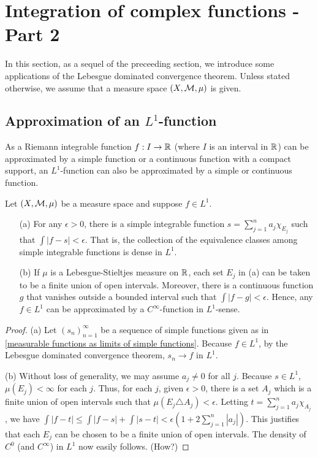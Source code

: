 \section{Integration of complex functions - Part 2}

In this section, as a sequel of the preceeding section, we introduce some applications of the Lebesgue dominated convergence theorem.
Unless stated otherwise, we assume that a measure space $(X, {\mathcal{M}}, \mu)$ is given.

\subsection{Approximation of an $L^1$-function}
As a Riemann integrable function $f: I\rightarrow{\mathbb{R}}$ (where $I$ is an interval in ${\mathbb{R}}$) can be approximated by a simple function or a continuous function with a compact support, an $L^1$-function can also be approximated by a simple or continuous function.
\begin{thm}
    Let $(X, {\mathcal{M}}, \mu)$ be a measure space and suppose $f\in L^1$.
    \begin{enumerate}
        \item[(a)]
        {
            For any $\epsilon>0$, there is a simple integrable function $s=\sum_{j=1}^n a_j\chi_{E_j}$ such that $\int|f-s|<\epsilon$.
            That is, the collection of the equivalence classes among simple integrable  functions is dense in $L^1$.
        }
        \item[(b)]
        {
            If $\mu$ is a Lebesgue-Stieltjes measure on ${\mathbb{R}}$, each set $E_j$ in (a) can be taken to be a finite union of open intervals.
            Moreover, there is a continuous function $g$ that vanishes outside a bounded interval such that $\int|f-g|<\epsilon$.
            Hence, any $f\in L^1$ can be approximated by a $C^\infty$-function in $L^1$-sense.
        }
    \end{enumerate}
\end{thm}
\begin{proof}
    \hangindent=0.65cm

    \noindent(a)
    Let $(s_n)_{n=1}^\infty$ be a sequence of simple functions given as in \cref{measurable functions as limits of simple functions}.
    Because $f\in L^1$, by the Lebesgue dominated convergence theorem, $s_n\rightarrow f$ in $L^1$.
    
    \noindent(b)
    Without loss of generality, we may assume $a_j\neq 0$ for all $j$.
    Because $s\in L^1$, $\mu(E_j)<\infty$ for each $j$.
    Thus, for each $j$, given $\epsilon>0$, there is a set $A_j$ which is a finite union of open intervals such that $\mu(E_j\triangle A_j)<\epsilon$.
    Letting $t=\sum_{j=1}^n a_j\chi_{A_j}$, we have $\int|f-t|\leq\int|f-s|+\int|s-t|<\epsilon(1+2\sum_{j=1}^n |a_j|)$.
    This justifies that each $E_j$ can be chosen to be a finite union of open intervals.
    The density of $C^0$ (and $C^\infty$) in $L^1$ now easily follows. \color{brown}(How?)\color{black}
\end{proof}

